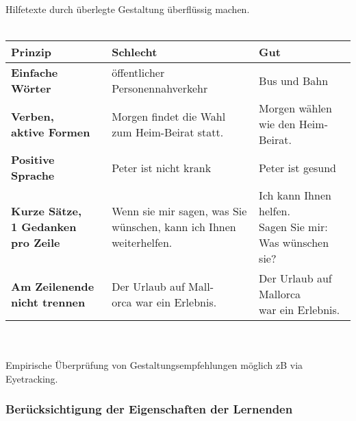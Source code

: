 \documentclass[a4paper]{article}
\begin{document}
Hilfetexte durch überlegte Gestaltung überflüssig machen.
\\~\\
\begin{tabular}{ p{3cm} p{5cm} p{5cm} }\toprule[1.5pt]
	\bf Prinzip 				
	& \bf Schlecht 	
	& \bf Gut \\ \midrule
	
	\bf Einfache Wörter 				
	& öffentlicher Personennahverkehr			   	
	& Bus und Bahn \\ \midrule
	
	\bf \makecell[l]{Verben,\\aktive Formen}
	& Morgen findet die Wahl zum Heim-Beirat statt.
	& Morgen wählen wie den Heim-Beirat. \\ \midrule
	
	\bf Positive Sprache
	& Peter ist nicht krank 	
	& Peter ist gesund \\ \midrule
	
	\bf \makecell[l]{Kurze Sätze,\\1 Gedanken \\pro Zeile}
	& \makecell[l]{Wenn sie mir sagen, was Sie\\wünschen, kann ich Ihnen\\weiterhelfen.}
	& \makecell[l]{Ich kann Ihnen helfen.\\Sagen Sie mir: Was wünschen sie?} \\ \midrule
	
	\bf Am Zeilenende nicht trennen
	& \makecell[l]{Der Urlaub auf Mall-\\orca war ein Erlebnis.}
	& \makecell[l]{Der Urlaub auf Mallorca\\war ein Erlebnis.} \\ 
	\bottomrule[1.5pt]
\end{tabular}
~\\~\\
Empirische Überprüfung von Gestaltungsempfehlungen möglich zB via Eyetracking.

\subsubsection{Berücksichtigung der Eigenschaften der Lernenden}
\end{document}

